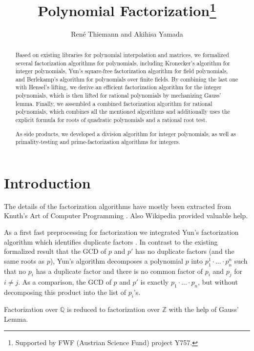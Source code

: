 \documentclass[11pt,a4paper]{article}
\newcommand\rats{\mathbb{Q}}
\newcommand\ints{\mathbb{Z}}
\begin{document}
\title{Polynomial Factorization\footnote{Supported by FWF (Austrian Science Fund) project Y757.}}
\author{Ren\'e Thiemann and Akihisa Yamada}
\maketitle

\begin{abstract}
Based on existing libraries for polynomial interpolation and matrices,
we formalized several factorization algorithms for polynomials, including
Kronecker's algorithm for integer polynomials,
Yun's square-free factorization algorithm for field polynomials, and
Berlekamp's algorithm for polynomials over finite fields.
By combining the last one with Hensel's lifting,
we derive an efficient factorization algorithm for the integer polynomials,
which is then lifted for rational polynomials by mechanizing Gauss' lemma.
Finally, we assembled a combined factorization algorithm for rational polynomials,
which combines all the mentioned algorithms and additionally uses the explicit formula for roots 
of quadratic polynomials and a rational root test.

As side products, we developed a division algorithm for integer polynomials,
as well as primality-testing and prime-factorization algorithms for integers.
\end{abstract}

\tableofcontents

\section{Introduction}

The details of the factorization algorithms have mostly been extracted 
from Knuth's Art of Computer Programming
\cite{Knuth}. Also Wikipedia provided valuable help.

\medskip
As a first fast
preprocessing for factorization we integrated Yun's factorization algorithm which identifies duplicate
factors \cite{Yun}. In contrast to the existing formalized result that the GCD of $p$ and $p'$ has no
duplicate factors (and the same roots as $p$), Yun's algorithm decomposes a polynomial $p$ into
$p_1^1 \cdot \ldots \cdot p_n^n$ such that no $p_i$ has a duplicate factor and there is no common
factor of $p_i$ and $p_j$ for $i \neq j$. As a comparison, the GCD of $p$ and $p'$ is exactly
$p_1 \cdot \ldots \cdot p_n$, but without decomposing this product into the list of $p_i$'s.

Factorization over $\rats$ is reduced to factorization over $\ints$ 
with the help of Gauss' Lemma.
\end{document}
